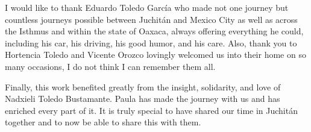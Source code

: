 \begin{refsection}

I would like to thank Eduardo Toledo Garc\'{i}a who made not one journey but countless journeys possible between Juchit\'{a}n and Mexico City as well as across the Isthmus and within the state of Oaxaca, always offering everything he could, including his car, his driving, his good humor, and his care. Also, thank you to Hortencia Toledo and Vicente Orozco lovingly welcomed us into their home on so many occasions, I do not think I can remember them all. 


Finally, this work benefited greatly from the insight, solidarity, and love of Nadxieli Toledo Bustamante. Paula has made the journey with us and has enriched every part of it. It is truly special to have shared our time in Juchit\'{a}n together and to now be able to share this with them.

\printbibliography[heading=subbibliography]
\end{refsection}

